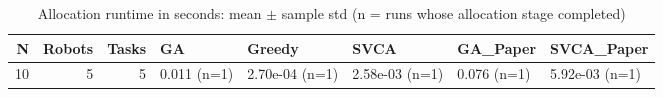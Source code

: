 \begin{table}[htbp]
\centering
\small
\caption{Allocation runtime in seconds: mean $\pm$ sample std (n = runs whose allocation stage completed)}
\label{tab:research_smoke_c1_r1_20261122_allocation_runtime}
\begin{tabular}{rrrlllll}
\hline
N & Robots & Tasks & GA & Greedy & SVCA & GA\_Paper & SVCA\_Paper \\
\hline
10 & 5 & 5 & 0.011 (n=1) & 2.70e-04 (n=1) & 2.58e-03 (n=1) & 0.076 (n=1) & 5.92e-03 (n=1) \\
\hline
\end{tabular}
\end{table}
